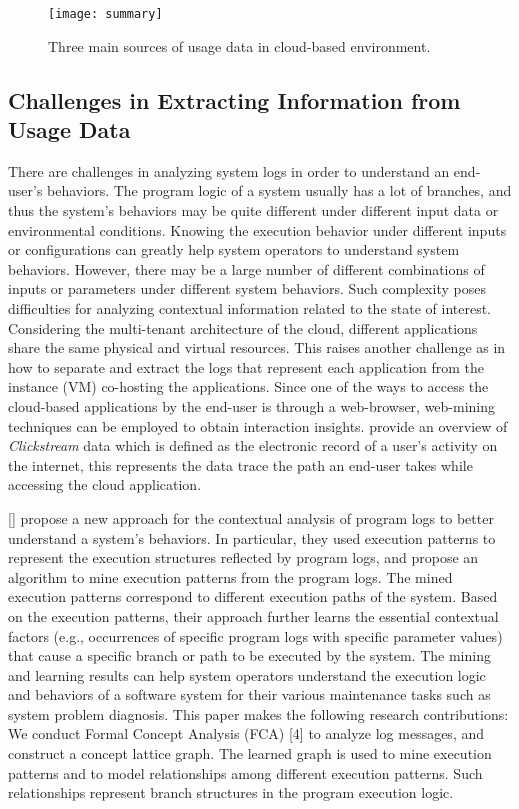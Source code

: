 \begin{figure}[t!]
	\centering
	\texttt{[image: summary]}
	\caption{Three main sources of usage data in cloud-based environment.}
	\label{fig:schema}
\end{figure}

\subsection{Challenges in Extracting Information from Usage Data}

There are challenges in analyzing system logs in order to understand an end-user’s behaviors. The program logic of a system usually has a lot of branches, and thus the system’s behaviors may be quite different under different input data or environmental conditions. Knowing the execution behavior under different inputs or configurations can greatly help system operators to understand system behaviors. However, there may be a large number of different combinations of inputs or parameters under different system behaviors. Such complexity poses difficulties for analyzing contextual information related to the state of interest. Considering the multi-tenant architecture of the cloud, different applications share the same physical and virtual resources. This raises another challenge as in how to separate and extract the logs that represent each application from the instance (VM) co-hosting the applications. 
%
Since one of the ways to access the cloud-based applications by the end-user is through a web-browser, web-mining techniques can be employed to obtain interaction insights. \cite{Bucklin2009} provide an overview of \emph{Clickstream} data which is defined as the electronic record of a user's activity on the internet, this represents the data trace the path an end-user takes while accessing the cloud application. 

[] propose a new approach for the contextual analysis of program logs to better understand a system’s behaviors. In particular, they used execution patterns to represent the execution structures reflected by program logs, and propose an algorithm to mine execution patterns from the program logs. The mined execution patterns correspond to different execution paths of the system. Based on the execution patterns, their approach further learns the essential contextual factors (e.g., occurrences of specific program logs with specific parameter values) that cause a specific branch or path to be executed by the system. 
% 
% 
%
The mining and learning results can help system operators understand the execution logic and behaviors of a software system for their various maintenance tasks such as system problem diagnosis. This paper makes the following research contributions: We conduct Formal Concept Analysis (FCA) [4] to analyze log messages, and construct a concept lattice graph. The learned graph is used to mine execution patterns and to model relationships among different execution patterns. Such relationships represent branch structures in the program execution logic.

